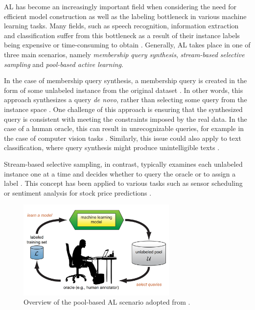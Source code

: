 \documentclass[english,bachelor,ul]{webisthesis} %
\begin{document}
AL has become an increasingly important field when considering the need for efficient model construction as well as the labeling bottleneck in various machine learning tasks. Many fields, such as speech recognition, information extraction and classification suffer from this bottleneck as a result of their instance labels being expensive or time-consuming to obtain \citep{settles.tr09}. Generally, AL takes place in one of three main scenarios, namely \textit{membership query synthesis}, \textit{stream-based selective sampling} and \textit{pool-based active learning}. 

In the case of membership query synthesis, a membership query is created in the form of some unlabeled instance from the original dataset \citep{DBLP:journals/ml/Angluin87, DBLP:journals/ijon/WangHYL15}. In other words, this approach synthesizes a query \textit{de novo}, rather than selecting some query from the instance space \citep{settles.tr09}. One challenge of this approach is ensuring that the synthesized query is consistent with meeting the constraints imposed by the real data. In the case of a human oracle, this can result in unrecognizable queries, for example in the case of computer vision tasks \citep{langbaum92}. Similarly, this issue could also apply to text classification, where query synthesis might produce unintelligible texts \citep{settles.tr09}.

Stream-based selective sampling, in contrast, typically examines each unlabeled instance one at a time and decides whether to query the oracle or to assign a label \citep{settles.tr09}. This concept has been applied to various tasks such as sensor scheduling \citep{DBLP:journals/tsp/Krishnamurthy02} or sentiment analysis for stock price predictions \citep{DBLP:journals/isci/SmailovicGLZ14}.

\begin{figure}[htbp]
    \centering
    \includegraphics[width=0.7\textwidth]{img/al.png}
    \caption{Overview of the pool-based AL scenario adopted from \cite{settles.tr09}.}
    \label{fig:activelearning}
\end{figure}
\end{document}
